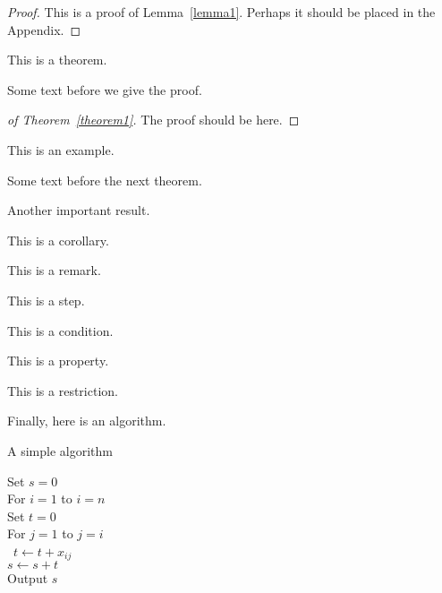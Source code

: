 \documentclass[lineno]{biometrika}
\begin{document}
\begin{proof}
This is a proof of Lemma~\ref{lemma1}.  Perhaps it should be placed in the Appendix.
\end{proof}

\begin{theorem}
\label{theorem1}
This is a theorem.
\end{theorem}

Some text before we give the proof.

\begin{proof}[of Theorem~\ref{theorem1}]
The proof should be here.
\end{proof}

\begin{example}
This is an example.
\end{example}

Some text before the next theorem.

\begin{theorem}
Another important result.
\end{theorem}

\begin{corollary}
This is a corollary.
\end{corollary}

\begin{remark}
This is a remark.
\end{remark}

\begin{step}
This is a step.
\end{step}

\begin{condition}
This is a condition.
\end{condition}


\begin{property}
This is a property.
\end{property}

\begin{restriction}
This is a restriction.
\end{restriction}

\begin{algo}
Finally, here is an algorithm.
\end{algo}


\begin{algorithm}[!h]
\caption{A simple algorithm} \label{al1}
\vspace*{-12pt}
\begin{tabbing}
   \enspace Set $s=0$\\
   \enspace For $i=1$ to $i=n$ \\
   \qquad Set $t=0$\\
   \qquad For $j=1$ to $j=i$ \\\
  \qquad\qquad  $t \leftarrow t + x_{ij}$ \\
\qquad $s \leftarrow s + t$ \\
\enspace Output $s$
\end{tabbing}
\end{algorithm}
\end{document}
